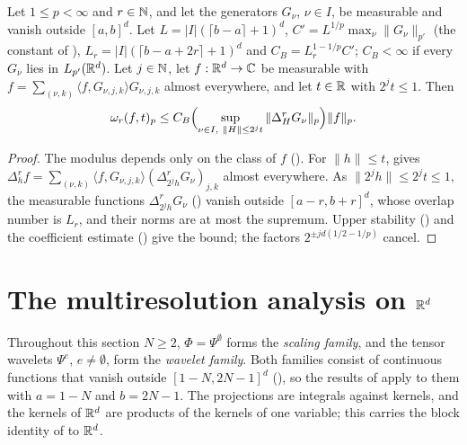 \begin{theorem}
\label{thm:daub-rd-expansion-moduli}
\leanok
{}
Let $1 \leq p < \infty$ and $r \in \mathbb{N}$, and let the generators $G_\nu$, $\nu \in I$, be
measurable and vanish outside $[a, b]^d$. Let $L = |I| (\lceil b - a \rceil + 1)^d$,
$C' = L^{1/p} \max_\nu \|G_\nu\|_{p'}$ (the constant of ),
$L_r = |I| (\lceil b - a + 2r \rceil + 1)^d$ and $C_B = L_r^{1 - 1/p} C'$; $C_B < \infty$ if every
$G_\nu$ lies in $L_{p'}(\mathbb{R}^d)$.
Let $j \in \mathbb{N}$, let $f : \mathbb{R}^d \to \mathbb{C}$ be measurable with
$f = \sum_{(\nu, k)} \langle f, G_{\nu,j,k} \rangle G_{\nu,j,k}$ almost everywhere, and let
$t \in \mathbb{R}$ with $2^j t \leq 1$. Then
\[
  \omega_r(f, t)_p \leq C_B \Bigl(\sup_{\nu \in I, \ \|H\| \leq 2^j t}
    \|\Delta_H^r G_\nu\|_p\Bigr) \|f\|_p .
\]
\end{theorem}

\begin{proof}
\leanok
{}
The modulus depends only on the class of $f$ (). For $\|h\| \leq t$,
 gives
$\Delta_h^r f = \sum_{(\nu, k)} \langle f, G_{\nu,j,k} \rangle (\Delta_{2^j h}^r G_\nu)_{j,k}$
almost everywhere. As $\|2^j h\| \leq 2^j t \leq 1$, the measurable functions
$\Delta_{2^j h}^r G_\nu$ () vanish outside $[a - r, b + r]^d$, whose
overlap number is $L_r$, and their norms are at most the supremum. Upper stability
() and the coefficient estimate
() give the bound; the factors $2^{\pm jd(1/2 - 1/p)}$
cancel.
\end{proof}

\section{The multiresolution analysis on \texorpdfstring{$\mathbb{R}^d$}{R\^{}d}}
\label{sec:daub-rd-mra}

Throughout this section $N \geq 2$, $\Phi = \Psi^\emptyset$ forms the \emph{scaling family}, and
the tensor wavelets $\Psi^e$, $e \neq \emptyset$, form the \emph{wavelet family}. Both families
consist of continuous functions that vanish outside $[1 - N, 2N - 1]^d$
(), so the results of  apply to
them with $a = 1 - N$ and $b = 2N - 1$. The projections are integrals against kernels, and the
kernels of $\mathbb{R}^d$ are products of the kernels of one variable; this carries the block identity of
 to $\mathbb{R}^d$.

